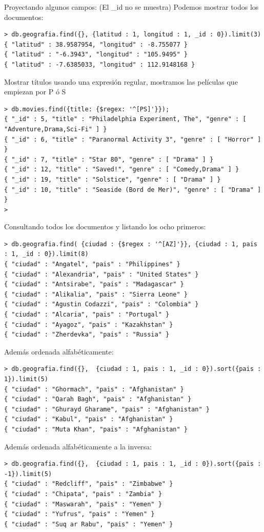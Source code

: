 \documentclass[4paper]{article}
\begin{document}
Proyectando algunos campos: (El \_id no se muestra)
Podemos mostrar todos los documentos:
\begin{lstlisting}
> db.geografia.find({}, {latitud : 1, longitud : 1, _id : 0}).limit(3)
{ "latitud" : 38.9587954, "longitud" : -8.755077 }
{ "latitud" : "-6.3943", "longitud" : "105.9495" }
{ "latitud" : -7.6385033, "longitud" : 112.9148168 }
\end{lstlisting}

Mostrar títulos usando una expresión regular, mostramos las películas que empiezan por P ó S
\begin{lstlisting}
> db.movies.find({title: {$regex: '^[PS]'}});
{ "_id" : 5, "title" : "Philadelphia Experiment, The", "genre" : [ "Adventure,Drama,Sci-Fi" ] }
{ "_id" : 6, "title" : "Paranormal Activity 3", "genre" : [ "Horror" ] }
{ "_id" : 7, "title" : "Star 80", "genre" : [ "Drama" ] }
{ "_id" : 12, "title" : "Saved!", "genre" : [ "Comedy,Drama" ] }
{ "_id" : 19, "title" : "Solstice", "genre" : [ "Drama" ] }
{ "_id" : 10, "title" : "Seaside (Bord de Mer)", "genre" : [ "Drama" ] }
> 
\end{lstlisting}

\newpage
Consultando todos los documentos y listando los ocho primeros:
\begin{lstlisting}
> db.geografia.find( {ciudad : {$regex : '^[AZ]'}}, {ciudad : 1, pais : 1, _id : 0}).limit(8)
{ "ciudad" : "Angatel", "pais" : "Philippines" }
{ "ciudad" : "Alexandria", "pais" : "United States" }
{ "ciudad" : "Antsirabe", "pais" : "Madagascar" }
{ "ciudad" : "Alikalia", "pais" : "Sierra Leone" }
{ "ciudad" : "Agustin Codazzi", "pais" : "Colombia" }
{ "ciudad" : "Alcaria", "pais" : "Portugal" }
{ "ciudad" : "Ayagoz", "pais" : "Kazakhstan" }
{ "ciudad" : "Zherdevka", "pais" : "Russia" }
\end{lstlisting}

Además ordenada alfabéticamente:
\begin{lstlisting}
> db.geografia.find({},  {ciudad : 1, pais : 1, _id : 0}).sort({pais : 1}).limit(5)
{ "ciudad" : "Ghormach", "pais" : "Afghanistan" }
{ "ciudad" : "Qarah Bagh", "pais" : "Afghanistan" }
{ "ciudad" : "Ghurayd Gharame", "pais" : "Afghanistan" }
{ "ciudad" : "Kabul", "pais" : "Afghanistan" }
{ "ciudad" : "Muta Khan", "pais" : "Afghanistan" }
\end{lstlisting}

Además ordenada alfabéticamente a la inversa:
\begin{lstlisting}
> db.geografia.find({},  {ciudad : 1, pais : 1, _id : 0}).sort({pais : -1}).limit(5)
{ "ciudad" : "Redcliff", "pais" : "Zimbabwe" }
{ "ciudad" : "Chipata", "pais" : "Zambia" }
{ "ciudad" : "Maswarah", "pais" : "Yemen" }
{ "ciudad" : "Yufrus", "pais" : "Yemen" }
{ "ciudad" : "Suq ar Rabu", "pais" : "Yemen" }
\end{lstlisting}
\end{document}
